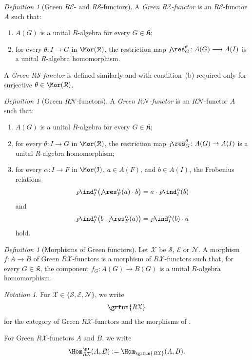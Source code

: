 \documentclass{amsart}
\numberwithin{equation}{section}%
\theoremstyle{remark}
\newtheorem{Def}[equation]{Definition}
\newtheorem{Not}[equation]{Notation}
\theoremstyle{definition}
\newcommand{\e}{\mathcal E}
\newcommand{\s}{\mathcal S}
\newcommand{\n}{\mathcal N}
\newcommand{\lind}[1]{{}_{#1}\!\ind}
\newcommand{\lres}[1]{{}_{#1}\!\res}
\begin{document}
%
\begin{Def}[Green $R\e$- and $R\s$-functors]
\label{def:Green-E-functor}
\label{def:Green-S-functor}
A \emph{Green $R\e$-functor} is an $R\e$-functor $A$ such that:
%
\begin{enumerate}
\item $A(G)$ is a unital $R$-algebra for every
$G\in\mathfrak K$;

\item for every $\theta\colon I\to G$ in
$\Mor(\mathcal R)$, the restriction map
$\lres{I}_G^\theta\colon A(G)\longrightarrow A(I)$
is a unital $R$-algebra homomorphism.
\end{enumerate}
%
A \emph{Green $R\s$-functor} is defined similarly and with condition~(b)
required only for surjective $\theta\in\Mor(\mathcal R)$.
\end{Def}
%
\begin{Def}[Green $R\mathcal N$-functors]
\label{def:Green-N-functor}
A \emph{Green $R\mathcal N$-functor} is an
$R\mathcal N$-functor $A$ such that:
%
\begin{enumerate}
\item $A(G)$ is a unital $R$-algebra for every
$G\in\mathfrak K$;

\item for every $\theta\colon I\to G$ in
$\Mor(\mathcal R)$, the restriction map
$\lres{I}_G^\theta\colon A(G)\to A(I)$
is a unital $R$-algebra homomorphism;

\item for every $\alpha\colon I\to F$ in $\Mor(\mathcal I)$,
$a\in A(F)$, and $b\in A(I)$, the Frobenius relations
%
\[
{}\lind{F}_I^\alpha
\bigl({}\lres{I}_F^\alpha(a)\cdot b\bigr)
=
a\cdot{}\lind{F}_I^\alpha(b)
\]
%
and
%
\[
{}\lind{F}_I^\alpha
\bigl(b\cdot{}\lres{I}_F^\alpha(a)\bigr)
=
{}\lind{F}_I^\alpha(b)\cdot a
\]
%
hold.
\end{enumerate}
\end{Def}
%
\begin{Def}[Morphisms of Green functors]
\label{def:Green-functor-morphisms}
Let $\mathcal X$ be $\s$, $\e$ or $\n$.
A morphism $f\colon A\to B$ of Green $R\mathcal X$-functors is
a morphism of $R\mathcal X$-functors such that, for every
$G\in\mathfrak K$, the component
$f_G\colon A(G)\to B(G)$ is a unital $R$-algebra homomorphism.
\end{Def}
%
\begin{Not}
\label{not:Green-functor-categories}
For $\mathcal X\in\{\s,\e,\n\}$, we write
%
\[
\grfun{R\mathcal X}
\]
%
for the category of Green $R\mathcal X$-functors and the morphisms of
.

For Green $R\mathcal X$-functors $A$ and $B$, we write
\[
\Hom_{R\mathcal X}^\gr(A,B)
:=
\Hom_{\grfun{R\mathcal X}}(A,B).
\]
\end{Not}
\end{document}
